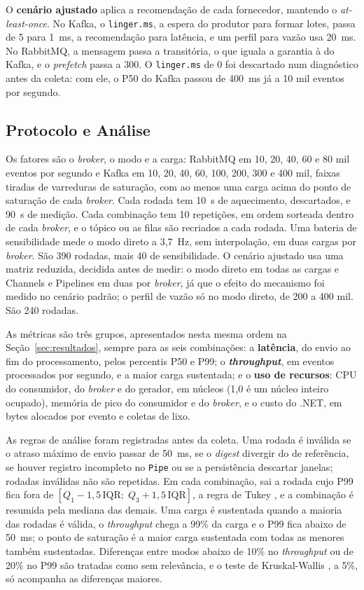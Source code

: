 \documentclass[12pt]{article}
\begin{document}
O \textbf{cenário ajustado} aplica a recomendação de cada fornecedor, mantendo o
\textit{at-least-once}. No Kafka, o \texttt{linger.ms}, a espera do produtor para formar
lotes, passa de 5 para 1~ms, a recomendação para latência, e um perfil para vazão usa
20~ms. No RabbitMQ, a mensagem passa a transitória, o que iguala a garantia à do Kafka, e o
\textit{prefetch} passa a 300. O \texttt{linger.ms} de 0 foi descartado num diagnóstico
antes da coleta: com ele, o P50 do Kafka passou de 400~ms já a 10 mil eventos por segundo.

\subsection{Protocolo e Análise}
\label{sec:analise}

Os fatores são o \textit{broker}, o modo e a carga: RabbitMQ em 10, 20, 40, 60 e 80 mil eventos
por segundo e Kafka em 10, 20, 40, 60, 100, 200, 300 e 400 mil, faixas tiradas de
varreduras de saturação, com ao menos uma carga acima do ponto de saturação de cada
\textit{broker}. Cada rodada tem 10~s de aquecimento, descartados, e 90~s de medição. Cada
combinação tem 10 repetições, em ordem sorteada dentro de cada \textit{broker}, e o tópico ou as
filas são recriados a cada rodada. Uma bateria de sensibilidade mede o modo direto a
3,7~Hz, sem interpolação, em duas cargas por \textit{broker}. São 390 rodadas, mais 40 de
sensibilidade. O cenário ajustado usa uma matriz reduzida, decidida antes de medir: o modo
direto em todas as cargas e Channels e Pipelines em duas por \textit{broker}, já que o efeito do
mecanismo foi medido no cenário padrão; o perfil de vazão só no modo direto, de 200 a 400
mil. São 240 rodadas.

As métricas são três grupos, apresentados nesta mesma ordem na
Seção~\ref{sec:resultados}, sempre para as seis combinações: a \textbf{latência}, do envio
ao fim do processamento, pelos percentis P50 e P99; o \textbf{\textit{throughput}}, em eventos
processados por segundo, e a maior carga sustentada; e o \textbf{uso de recursos}: CPU do
consumidor, do \textit{broker} e do gerador, em núcleos (1,0 é um núcleo inteiro ocupado), memória
de pico do consumidor e do \textit{broker}, e o custo do .NET, em bytes alocados por evento e
coletas de lixo.

As regras de análise foram registradas antes da coleta. Uma rodada é inválida se o atraso
máximo de envio passar de 50~ms, se o \textit{digest} divergir do de referência, se houver registro
incompleto no \texttt{Pipe} ou se a persistência descartar janelas; rodadas inválidas não
são repetidas. Em cada combinação, sai a rodada cujo P99 fica fora de
$[Q_1 - 1{,}5\,\mathrm{IQR};\; Q_3 + 1{,}5\,\mathrm{IQR}]$, a regra de Tukey
\cite{tukey:1977}, e a combinação é resumida pela mediana das demais. Uma carga é
sustentada quando a maioria das rodadas é válida, o \textit{throughput} chega a 99\% da carga e o
P99 fica abaixo de 50~ms; o ponto de saturação é a maior carga sustentada com todas as
menores também sustentadas. Diferenças entre modos abaixo de 10\% no \textit{throughput} ou de 20\%
no P99 são tratadas como sem relevância, e o teste de Kruskal-Wallis
\cite{kruskal:1952}, a 5\%, só acompanha as diferenças maiores.
\end{document}
